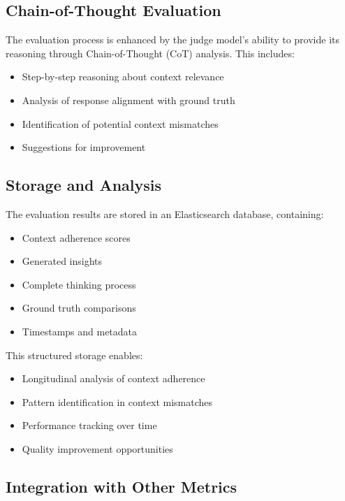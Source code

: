 \documentclass[12pt]{article}
\begin{document}
\subsection{Chain-of-Thought Evaluation}

The evaluation process is enhanced by the judge model's ability to provide its reasoning through Chain-of-Thought (CoT) analysis. This includes:

\begin{itemize}
    \item Step-by-step reasoning about context relevance
    \item Analysis of response alignment with ground truth
    \item Identification of potential context mismatches
    \item Suggestions for improvement
\end{itemize}

\subsection{Storage and Analysis}

The evaluation results are stored in an Elasticsearch database, containing:

\begin{itemize}
    \item Context adherence scores
    \item Generated insights
    \item Complete thinking process
    \item Ground truth comparisons
    \item Timestamps and metadata
\end{itemize}

This structured storage enables:
\begin{itemize}
    \item Longitudinal analysis of context adherence
    \item Pattern identification in context mismatches
    \item Performance tracking over time
    \item Quality improvement opportunities
\end{itemize}

\subsection{Integration with Other Metrics}
\end{document}
